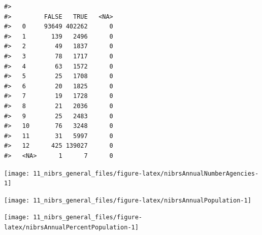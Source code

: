 \documentclass[
]{krantz}
\let\origfigure\figure
\let\endorigfigure\endfigure
\renewenvironment{figure}[1][2] {
    \expandafter\origfigure\expandafter[H]
} {
    \endorigfigure
}
\begin{document}
\begin{verbatim}
#>       
#>         FALSE   TRUE   <NA>
#>   0     93649 402262      0
#>   1       139   2496      0
#>   2        49   1837      0
#>   3        78   1717      0
#>   4        63   1572      0
#>   5        25   1708      0
#>   6        20   1825      0
#>   7        19   1728      0
#>   8        21   2036      0
#>   9        25   2483      0
#>   10       76   3248      0
#>   11       31   5997      0
#>   12      425 139027      0
#>   <NA>      1      7      0
\end{verbatim}

\begin{figure}

{\centering \texttt{[image: 11\_nibrs\_general\_files/figure-latex/nibrsAnnualNumberAgencies-1]} 

}

\caption{The annual number of police agencies that report data to NIBRS.}\label{fig:nibrsAnnualNumberAgencies}
\end{figure}

\begin{figure}

{\centering \texttt{[image: 11\_nibrs\_general\_files/figure-latex/nibrsAnnualPopulation-1]} 

}

\caption{The annual population in the United States that is covered by an agency reporting data to NIBRS.}\label{fig:nibrsAnnualPopulation}
\end{figure}

\begin{figure}

{\centering \texttt{[image: 11\_nibrs\_general\_files/figure-latex/nibrsAnnualPercentPopulation-1]} 

}

\caption{The annual percent of the United States population that is covered by an agency reporting data to NIBRS.}\label{fig:nibrsAnnualPercentPopulation}
\end{figure}
\end{document}

